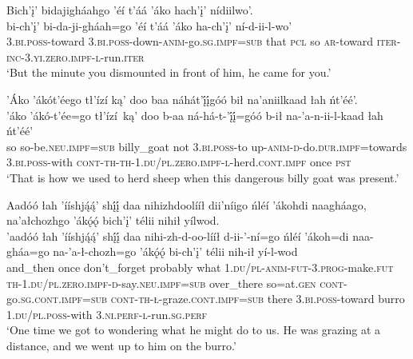 \ea\label{ex:text6-7-9}
Bich’į’ bidajigháahgo ’éí t’áá ’áko hach’į’ nídiilwo’.\\
\gll bi-ch’į’	bi-da-ji-gháah=go	’éí	t’áá	’áko	ha-ch’į’	ní-d-ii-l-wo’\\
     3.\textsc{bi}.\textsc{poss}-toward	3.\textsc{bi}.\textsc{poss}-down-\textsc{anim}-go.\textsc{sg}.\textsc{impf}=\textsc{sub}	that	\textsc{pcl}	so	\textsc{ar}-toward	\textsc{iter}-\textsc{inc}-3.\textsc{yi}.\textsc{zero}.\textsc{impf}-\textsc{l}-run.\textsc{iter}\\
\glt `But the minute you dismounted in front of him, he came for you.'
\z

\ea\label{ex:text6-7-10}
’Áko ’ákót’éego tł’ízí ką’ doo baa náhát’į́į́góó bił na’aniilkaad łah ńt’éé’.\\
\gll ’áko	’ákó-t’ée=go	tł’ízí~{ką’}	doo	b-aa	ná-há-t-’į́į́=góó	b-ił	na-’a-n-ii-l-kaad	łah	ńt’éé’\\
     so	so-be.\textsc{neu}.\textsc{impf}=\textsc{sub}	billy\_goat	not	3.\textsc{bi}.\textsc{poss}-to	up-\textsc{anim}-\textsc{d}-do.\textsc{dur}.\textsc{impf}=towards	3.\textsc{bi}.\textsc{poss}-with	\textsc{cont}-\textsc{th}-\textsc{th}-1.\textsc{du}/\textsc{pl}.\textsc{zero}.\textsc{impf}-\textsc{l}-herd.\textsc{cont}.\textsc{impf}	once	\textsc{pst}\\
\glt `That is how we used to herd sheep when this dangerous billy goat was present.'
\z

\ea\label{ex:text6-8-1}
Aadóó łah ’ííshją́ą́’ shį́į́ daa nihizhdoolííł dii’níigo ńléí ’ákohdi naagháago, na’ałchozhgo ’ákǫ́ǫ́ bich’į’ télii nihił yílwod.\\
\gll ’aadóó	łah	’ííshją́ą́’	shį́į́	daa	nihi-zh-d-oo-lííł	d-ii-’-ní=go	ńléí	’ákoh=di	naa-gháa=go	na-’a-ł-chozh=go	’ákǫ́ǫ́	bi-ch’į’	télii	nih-ił	yí-l-wod\\
     and\_then	once	don’t\_forget	probably	what	1.\textsc{du}/\textsc{pl}-\textsc{anim}-\textsc{fut}-3.\textsc{prog}-make.\textsc{fut}	\textsc{th}-1.\textsc{du}/\textsc{pl}.\textsc{zero}.\textsc{impf}-\textsc{d}-say.\textsc{neu}.\textsc{impf}=\textsc{sub}	over\_there	so=at.\textsc{gen}	\textsc{cont}-go.\textsc{sg}.\textsc{cont}.\textsc{impf}=\textsc{sub}	\textsc{cont}-\textsc{th}-\textsc{ł}-graze.\textsc{cont}.\textsc{impf}=\textsc{sub}	there	3.\textsc{bi}.\textsc{poss}-toward	burro	1.\textsc{du}/\textsc{pl}.\textsc{poss}-with	3.\textsc{ni}.\textsc{perf}-\textsc{l}-run.\textsc{sg}.\textsc{perf}\\
\glt `One time we got to wondering what he might do to us. He was grazing at a distance, and we went up to him on the burro.'
\z

